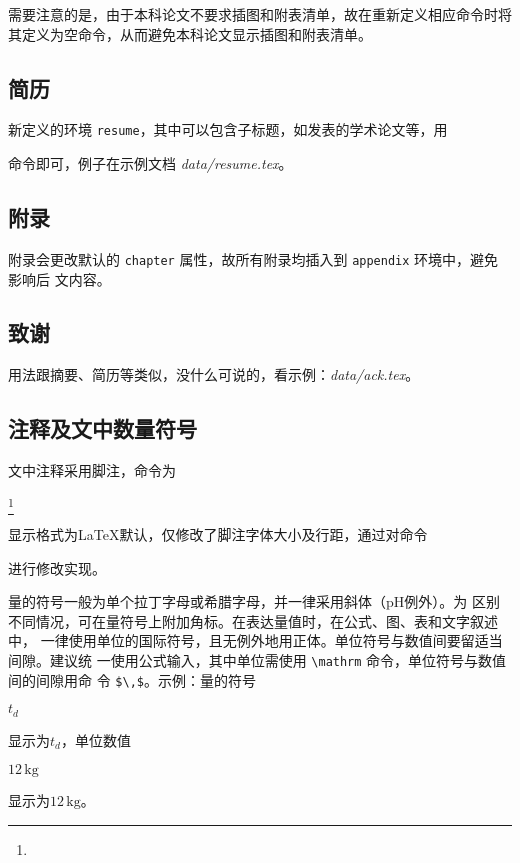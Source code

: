需要注意的是，由于本科论文不要求插图和附表清单，故在重新定义相应命令时将其定义为空命令，从而避免本科论文显示插图和附表清单。

\subsection*{简历}

新定义的环境 \texttt{resume}，其中可以包含子标题，如发表的学术论文等，用
\begin{latex}
\resumeitem{}
\end{latex}
命令即可，例子在示例文档 \emph{data/resume.tex}。

\subsection*{附录}

附录会更改默认的 \texttt{chapter} 属性，故所有附录均插入到 \texttt{appendix} 环境中，避免影响后
文内容。
\begin{latex}
\begin{appendix}
 
 
\end{appendix}
\end{latex}

\subsection*{致谢}

用法跟摘要、简历等类似，没什么可说的，看示例：\emph{data/ack.tex}。

\subsection*{注释及文中数量符号}

文中注释采用脚注，命令为 
\begin{latex}
\footnote{}
\end{latex}
显示格式为\LaTeX{}默认，仅修改了脚注字体大小及行距，通过对命令
\begin{latex}
\footnotesize
\end{latex}
进行修改实现。

量的符号一般为单个拉丁字母或希腊字母，并一律采用斜体（$\mathrm{pH}$例外）。为
区别不同情况，可在量符号上附加角标。在表达量值时，在公式、图、表和文字叙述中，
一律使用单位的国际符号，且无例外地用正体。单位符号与数值间要留适当间隙。建议统
一使用公式输入，其中单位需使用 \verb|\mathrm| 命令，单位符号与数值间的间隙用命
令 \verb|$\,$|。示例：量的符号
\begin{latex}
$t_d$
\end{latex}
显示为$t_d$，单位数值
\begin{latex}
$12\,\mathrm{kg}$
\end{latex}
显示为$12\,\mathrm{kg}$。

